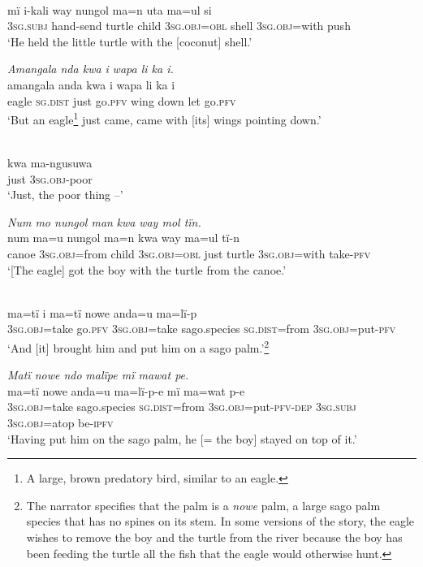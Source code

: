 \\
\gll mï      i-kali    way  nungol  ma=n uta    ma=ul si\\
3\textsc{sg.subj}  hand-send  turtle  child  3\textsc{sg.obj=obl}  shell  3\textsc{sg.obj}=with push\\
\glt ‘He held the little turtle with the {[coconut]} shell.’

\ex \textit{Amangala nda kw}{\textit{a i}} \textit{w}{\textit{a}}\textit{pa li ka i.}\\
\gll amangala  anda    kwa  i wapa  li    ka  i\\
eagle    \textsc{sg.dist}  just    go.\textsc{pfv}  wing  down  let  go.\textsc{pfv}\\
\glt ‘But an eagle\footnote{A large, brown predatory bird, similar to an eagle.} just came, came with [its] wings pointing down.’

\\
\gll kwa  ma-ngusuwa\\
 just    3\textsc{sg.obj-}poor\\
\glt ‘Just, the poor thing --’

\ex \textit{N}{\textit{u}}\textit{m mo nungol man} {\textit{kwa}} \textit{way mol tïn.}\\
\gll n{u}m  m{a=u} nungol  ma=n      {kwa} way  m{a=u}l tï{{}-}n\\
canoe  3\textsc{sg.obj}=from  child  3\textsc{sg.obj=obl}  just    turtle  3\textsc{sg.obj}=with take-\textsc{pfv}\\
\glt ‘{[The eagle] got the boy with the turtle from the canoe.}’

\newpage

\\
\gll ma{=}tï      i    ma{=}tï      nowe    anda=u ma=lï-p\\
3\textsc{sg.obj}=take  go.\textsc{pfv}  \textsc{3sg.obj}=take  sago.species  \textsc{sg.dist}=from 3\textsc{sg.obj}=put-\textsc{pfv}\\
\glt ‘And [it] brought him and put him on a sago palm.’\footnote{The narrator specifies that the palm is a \textit{nowe} palm, a large sago palm species that has no spines on its stem. In some versions of the story, the eagle wishes to remove the boy and the turtle from the river because the boy has been feeding the turtle all the fish that the eagle would otherwise hunt.}

\ex \textit{Matï nowe nd}{\textit{o}} \textit{m}{\textit{a}}\textit{lïpe mï maw}{\textit{a}}\textit{t pe.}\\
\gll ma{=}tï      nowe    and{a=u} m{a=}lï-p{{}-}e        mï m{a=}w{at} p{{}-}e\\
3\textsc{sg.obj}=take  sago.species  \textsc{sg.dist}=from  3\textsc{sg.obj}=put-\textsc{pfv-dep}  \textsc{3sg.subj} \textsc{3sg.obj=}atop  be-\textsc{ipfv}\\
\glt ‘Having put him on the sago palm, he [= the boy] stayed on top of it.’

